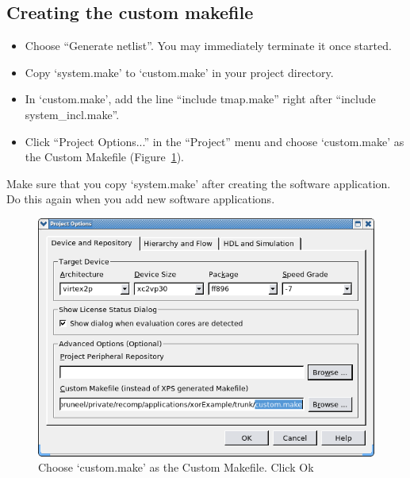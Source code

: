 \documentclass[a4paper,oneside]{memoir}
\begin{document}
\subsection{Creating the custom makefile}\label{sec:creating_makefile}
\begin{itemize}
\item Choose  ``Generate netlist''. You may immediately terminate it once started.
\item Copy `system.make' to `custom.make' in your project directory.
\item In `custom.make', add the line ``include tmap.make'' right after ``include system\_incl.make''.
\item Click ``Project Options...'' in the ``Project'' menu and choose `custom.make' as the Custom Makefile (Figure~\ref{fig:makefile}).
\end{itemize}
Make sure that you  copy `system.make' after creating the software application. Do this again when you add new software applications.
\begin{figure}[H]
\centering
\includegraphics[scale=0.5]{make}
\caption{Choose `custom.make' as the Custom Makefile. Click Ok\label{fig:makefile}}
\end{figure}
\end{document}
